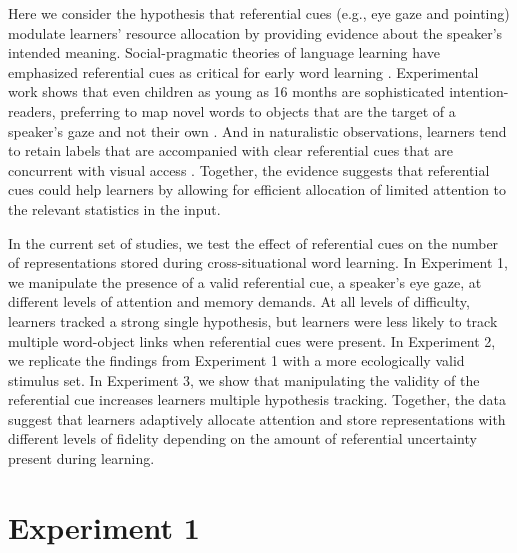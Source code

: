 \documentclass[10pt,letterpaper]{article}
\begin{document}
Here we consider the hypothesis that referential cues (e.g., eye gaze and pointing) modulate learners' resource allocation by providing evidence about the speaker's intended meaning. Social-pragmatic theories of language learning have emphasized referential cues as critical for early word learning  \cite{bloom2002children, clark2009first}. Experimental work shows that even children as young as 16 months are sophisticated intention-readers, preferring to map novel words to objects that are the target of a speaker's gaze and not their own \cite{baldwin1993infants}. And in naturalistic observations, learners tend to retain labels that are accompanied with clear referential cues that are concurrent with visual access \cite{yu2012embodied}. Together, the evidence suggests that referential cues could help learners by allowing for efficient allocation of limited attention to the relevant statistics in the input.

In the current set of studies, we test the effect of referential cues on the number of representations stored during cross-situational word learning. In Experiment 1, we manipulate the presence of a valid referential cue, a speaker's eye gaze, at different levels of attention and memory demands. At all levels of difficulty, learners tracked a strong single hypothesis, but learners were less likely to track multiple word-object links when referential cues were present. In Experiment 2, we replicate the findings from Experiment 1 with a more ecologically valid stimulus set. In Experiment 3, we show that manipulating the validity of the referential cue increases learners multiple hypothesis tracking. Together, the data suggest that learners adaptively allocate attention and store representations with different levels of fidelity depending on the amount of referential uncertainty present during learning.	


\section{Experiment 1}
\end{document}
